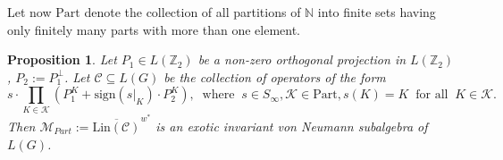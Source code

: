 \documentclass[11pt]{amsart}
\newcommand{\sign}{\mathrm{sign}}
\theoremstyle{plain}
\newtheorem{proposition}[theorem]{Proposition}
\theoremstyle{definition}
\theoremstyle{remark}
\numberwithin{equation}{section}
\begin{document}
Let  now $\mathrm{Part}$ denote the collection of all partitions of $\mathbb N$ into finite sets having only finitely many parts with more than one element. %

\begin{proposition}\label{prop: example P not projection} Let $P_1\in L(\mathbb Z_2)$ be a non-zero  orthogonal projection in $L(\mathbb Z_2)$, $P_2:=P_1^\perp$. Let $\mathcal C\subseteq L(G)$ be the collection of operators of the form $$s\cdot\prod\limits_{K\in\mathcal K}(P_1^K+\sign(s|_K)\cdot P_2^K),\;\;\text{where}\;\;s\in S_\infty,\mathcal K\in\mathrm{Part}, s(K)=K\;\;\text{for all}\;\;K\in\mathcal K.$$ 
Then $\mathcal{M}_{Part}:=\overline{\mathrm{Lin}(\mathcal C)}^{w^*}$ is an exotic invariant von Neumann subalgebra of $L(G)$. %
\end{proposition}
\end{document}
